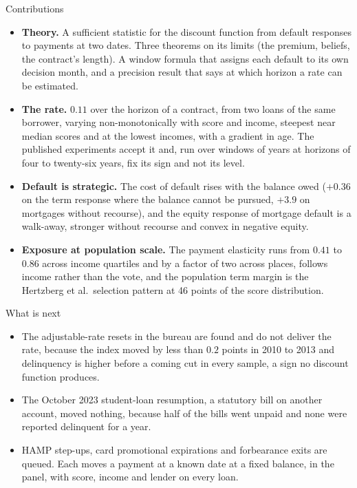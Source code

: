 \documentclass[aspectratio=169,11pt]{beamer}
\newcommand{\m}[1]{\item #1}
\begin{document}




\begin{frame}{Contributions}
\begin{itemize}\small
\m{\textbf{Theory.} A sufficient statistic for the discount function from default responses to payments at two dates. Three theorems on its limits (the premium, beliefs, the contract's length). A window formula that assigns each default to its own decision month, and a precision result that says at which horizon a rate can be estimated.}
\m{\textbf{The rate.} $0.11$ over the horizon of a contract, from two loans of the same borrower, varying non-monotonically with score and income, steepest near median scores and at the lowest incomes, with a gradient in age. The published experiments accept it and, run over windows of years at horizons of four to twenty-six years, fix its sign and not its level.}
\m{\textbf{Default is strategic.} The cost of default rises with the balance owed ($+0.36$ on the term response where the balance cannot be pursued, $+3.9$ on mortgages without recourse), and the equity response of mortgage default is a walk-away, stronger without recourse and convex in negative equity.}
\m{\textbf{Exposure at population scale.} The payment elasticity runs from $0.41$ to $0.86$ across income quartiles and by a factor of two across places, follows income rather than the vote, and the population term margin is the Hertzberg et al.\ selection pattern at 46 points of the score distribution.}
\end{itemize}
\end{frame}

\begin{frame}{What is next}
\begin{itemize}
\m{The adjustable-rate resets in the bureau are found and do not deliver the rate, because the index moved by less than $0.2$ points in 2010 to 2013 and delinquency is higher before a coming cut in every sample, a sign no discount function produces.}
\m{The October 2023 student-loan resumption, a statutory bill on another account, moved nothing, because half of the bills went unpaid and none were reported delinquent for a year.}
\m{HAMP step-ups, card promotional expirations and forbearance exits are queued. Each moves a payment at a known date at a fixed balance, in the panel, with score, income and lender on every loan.}
\end{itemize}
\label{main-end}
\end{frame}
\end{document}
